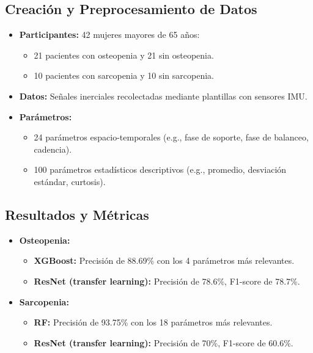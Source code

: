 \documentclass{report}
\begin{document}
\subsection{Creación y Preprocesamiento de Datos}
\begin{itemize}
    \item \textbf{Participantes:} 42 mujeres mayores de 65 años:
    \begin{itemize}
        \item 21 pacientes con osteopenia y 21 sin osteopenia.
        \item 10 pacientes con sarcopenia y 10 sin sarcopenia.
    \end{itemize}
    \item \textbf{Datos:} Señales inerciales recolectadas mediante plantillas con sensores IMU.
    \item \textbf{Parámetros:}
    \begin{itemize}
        \item 24 parámetros espacio-temporales (e.g., fase de soporte, fase de balanceo, cadencia).
        \item 100 parámetros estadísticos descriptivos (e.g., promedio, desviación estándar, curtosis).
    \end{itemize}
\end{itemize}

\subsection{Resultados y Métricas}
\begin{itemize}
    \item \textbf{Osteopenia:}
    \begin{itemize}
        \item \textbf{XGBoost:} Precisión de 88.69\% con los 4 parámetros más relevantes.
        \item \textbf{ResNet (transfer learning):} Precisión de 78.6\%, F1-score de 78.7\%.
    \end{itemize}
    \item \textbf{Sarcopenia:}
    \begin{itemize}
        \item \textbf{RF:} Precisión de 93.75\% con los 18 parámetros más relevantes.
        \item \textbf{ResNet (transfer learning):} Precisión de 70\%, F1-score de 60.6\%.
    \end{itemize}
\end{itemize}
\end{document}
